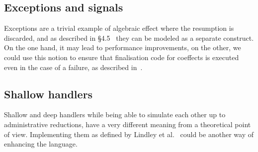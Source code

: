 \documentclass[declaration,shortabstract]{iithesis}
\theoremstyle{definition} \newtheorem{definition}{Definition}[chapter]
\theoremstyle{remark} \newtheorem{remark}[definition]{Observation}
\theoremstyle{plain} \newtheorem{theorem}[definition]{Theorem}
\theoremstyle{plain} \newtheorem{lemma}[definition]{Lemma}
\begin{document}
    \subsection{Exceptions and signals}

    Exceptions are a trivial example of algebraic effect where the resumption is
    discarded, and as described in \S 4.5~\cite{handlers-cps} they can be
    modeled as a separate construct. On the one hand, it may lead to
    performance improvements, on the other, we could use this notion to ensure
    that finalisation code for coeffects is executed even in the case of a
    failure, as described in~\cite{runners-in-action}.

    \subsection{Shallow handlers}

    Shallow and deep handlers while being able to simulate each other up to
    administrative reductions, have a very different meaning from a theoretical point
    of view. Implementing them as defined by Lindley et al.~\cite{shallow-handlers}
    could be another way of enhancing the language.



\printbibliography{}
\end{document}
